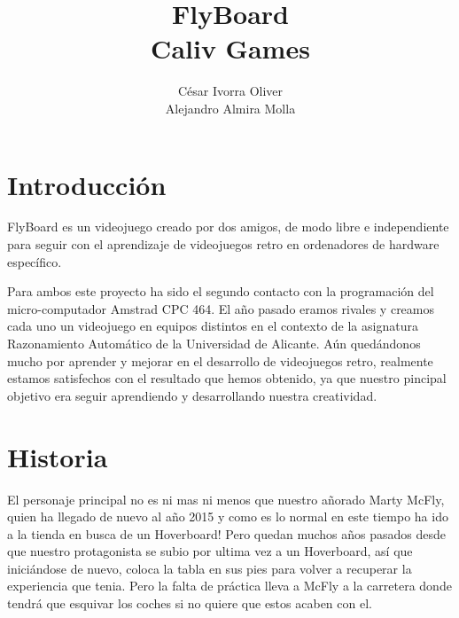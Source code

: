 \documentclass[11pt, spanish]{article}
\title{\textbf{FlyBoard} \\ {\footnotesize Caliv Games}}
\author{César Ivorra Oliver \\ Alejandro Almira Molla}
\begin{document}
\maketitle

\section{Introducción}
FlyBoard es un videojuego creado por dos amigos, de modo libre e independiente para seguir con el aprendizaje de videojuegos retro en ordenadores de hardware específico.

Para ambos este proyecto ha sido el segundo contacto con la programación del micro-computador Amstrad CPC 464. El año pasado eramos rivales y creamos cada uno un videojuego en equipos distintos en el contexto de la asignatura Razonamiento Automático de la Universidad de Alicante.
Aún quedándonos mucho por aprender y mejorar en el desarrollo de videojuegos retro, realmente estamos satisfechos con el resultado que hemos obtenido, ya que nuestro pincipal objetivo era seguir aprendiendo y desarrollando nuestra creatividad.

\section{Historia}
El personaje principal no es ni mas ni menos que nuestro añorado Marty McFly, quien ha llegado de nuevo al año 2015 y como es lo normal en este tiempo ha ido a la tienda en busca de un Hoverboard! Pero quedan muchos años pasados desde que nuestro protagonista se subio por ultima vez a un Hoverboard, así que iniciándose de nuevo, coloca la tabla en sus pies para volver a recuperar la experiencia que tenia.
Pero la falta de práctica lleva a McFly a la carretera donde tendrá que esquivar los coches si no quiere que estos acaben con el.
\end{document}
